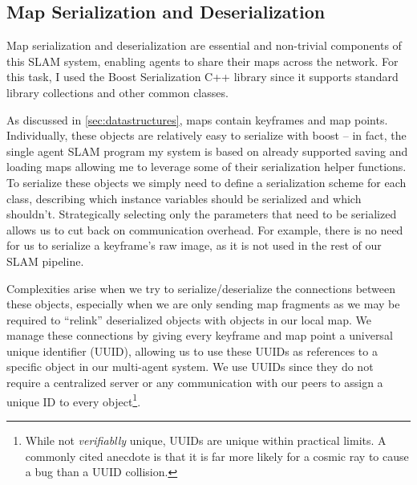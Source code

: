 \subsection{Map Serialization and Deserialization}
\label{sec:map-serialization-and-deserialization}
Map serialization and deserialization are essential and non-trivial components of this SLAM system, enabling agents to share their maps across the network. For this task, I used the Boost \autocite{boostLibrary} Serialization C++ library since it supports standard library collections and other common classes.

As discussed in \autoref{sec:datastructures}, maps contain keyframes and map points. Individually, these objects are relatively easy to serialize with boost – in fact, the single agent SLAM program my system is based on already supported saving and loading maps allowing me to leverage some of their serialization helper functions. To serialize these objects we simply need to define a serialization scheme for each class, describing which instance variables should be serialized and which shouldn't. Strategically selecting only the parameters that need to be serialized allows us to cut back on communication overhead. For example, there is no need for us to serialize a keyframe's raw image, as it is not used in the rest of our SLAM pipeline.

Complexities arise when we try to serialize/deserialize the connections between these objects, especially when we are only sending map fragments as we may be required to ``relink'' deserialized objects with objects in our local map. We manage these connections by giving every keyframe and map point a universal unique identifier (UUID), allowing us to use these UUIDs as references to a specific object in our multi-agent system. We use UUIDs since they do not require a centralized server or any communication with our peers to assign a unique ID to every object\footnote[1]{While not \textit{verifiablly} unique, UUIDs are unique within practical limits. A commonly cited anecdote is that it is far more likely for a cosmic ray to cause a bug than a UUID collision.}.


